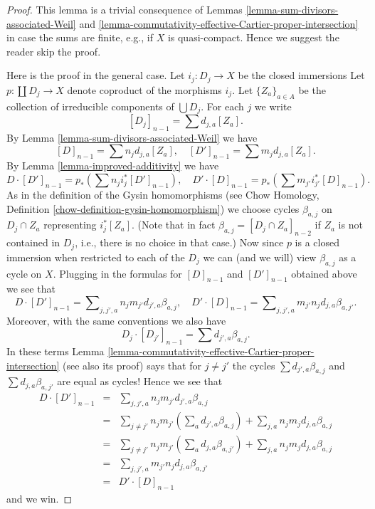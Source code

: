 \begin{proof}
This lemma is a trivial consequence of
Lemmas \ref{lemma-sum-divisors-associated-Weil} and
\ref{lemma-commutativity-effective-Cartier-proper-intersection}
in case the sums are finite, e.g., if $X$ is quasi-compact.
Hence we suggest the reader skip the proof.

\medskip\noindent
Here is the proof in the general case.
Let $i_j : D_j \to X$ be the closed immersions
Let $p : \coprod D_j \to X$ denote coproduct of the morphisms $i_j$.
Let $\{Z_a\}_{a \in A}$ be the collection of irreducible components of
$\bigcup D_j$. For each $j$ we write
$$
[D_j]_{n - 1} = \sum d_{j, a}[Z_a].
$$
By Lemma \ref{lemma-sum-divisors-associated-Weil} we have
$$
[D]_{n - 1} = \sum n_j d_{j, a} [Z_a],
\quad
[D']_{n - 1} = \sum m_j d_{j, a} [Z_a].
$$
By Lemma \ref{lemma-improved-additivity}
we have
$$
D \cdot [D']_{n - 1} = p_*\left(\sum n_j i_j^*[D']_{n - 1} \right),
\quad
D' \cdot [D]_{n - 1} = p_*\left(\sum m_{j'} i_{j'}^*[D]_{n - 1} \right).
$$
As in the definition of the Gysin homomorphisms (see
Chow Homology, Definition \ref{chow-definition-gysin-homomorphism})
we choose cycles $\beta_{a, j}$ on $D_j \cap Z_a$ representing
$i_j^*[Z_a]$. (Note that in fact $\beta_{a, j} = [D_j \cap Z_a]_{n - 2}$
if $Z_a$ is not contained in $D_j$, i.e., there is no choice in that case.)
Now since $p$ is a closed immersion when restricted to each of the $D_j$
we can (and we will) view $\beta_{a, j}$ as a cycle on $X$.
Plugging in the formulas for $[D]_{n - 1}$ and $[D']_{n - 1}$ obtained
above we see that
$$
D \cdot [D']_{n - 1} =
\sum\nolimits_{j, j', a} n_j m_{j'} d_{j', a} \beta_{a, j},
\quad
D' \cdot [D]_{n - 1} =
\sum\nolimits_{j, j', a} m_{j'} n_j d_{j, a} \beta_{a, j'}.
$$
Moreover, with the same conventions we also have
$$
D_j \cdot [D_{j'}]_{n - 1} = \sum d_{j', a} \beta_{a, j}.
$$
In these terms
Lemma \ref{lemma-commutativity-effective-Cartier-proper-intersection}
(see also its proof)
says that for $j \not = j'$ the cycles
$\sum d_{j', a} \beta_{a, j}$ and $\sum d_{j, a} \beta_{a, j'}$
are equal as cycles! Hence we see that
\begin{eqnarray*}
D \cdot [D']_{n - 1}
& = &
\sum\nolimits_{j, j', a} n_j m_{j'} d_{j', a} \beta_{a, j} \\
& = &
\sum\nolimits_{j \not = j'} n_j m_{j'}
\left(\sum\nolimits_a d_{j', a} \beta_{a, j}\right) +
\sum\nolimits_{j, a} n_j m_j d_{j, a} \beta_{a, j} \\
& = &
\sum\nolimits_{j \not = j'} n_j m_{j'}
\left(\sum\nolimits_a d_{j, a} \beta_{a, j'}\right) +
\sum\nolimits_{j, a} n_j m_j d_{j, a} \beta_{a, j} \\
& = &
\sum\nolimits_{j, j', a} m_{j'} n_j d_{j, a} \beta_{a, j'} \\
& = &
D' \cdot [D]_{n - 1}
\end{eqnarray*}
and we win.
\end{proof}

